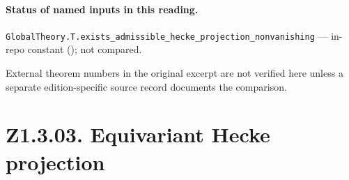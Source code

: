 
\paragraph{Status of named inputs in this reading.}
\noindent\nolinkurl{GlobalTheory.T.exists_admissible_hecke_projection_nonvanishing} --- in-repo constant (); not compared.\par
External theorem numbers in the original excerpt are not verified here unless a separate edition-specific source record documents the comparison.

\section*{Z1.3.03. Equivariant Hecke projection}

